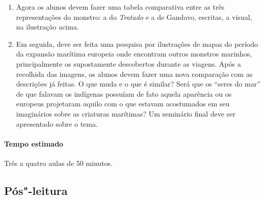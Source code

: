 \documentclass[12pt]{extarticle}
\begin{document}
{\begin{enumerate}
\begin{quote}
monstro, o qual em levantando a cabeça, tanto que o viu, começou de
caminhar para o mar donde viera. Nisto conheceu o mancebo que
era aquilo coisa do mar, e antes que nele se metesse, acudiu com muita
presteza a tomar"-lhe a dianteira, e vendo o monstro que ele lhe embargava 
o caminho, levantou"-se direito para cima como um homem, fincado sobre as 
barbatanas do rabo, e estando assim a par com ele, deu"-lhe uma estocada 
pela barriga, e dando"-lha no mesmo instante se desviou para uma parte 
com tanta velocidade, que não pôde o monstro levá"-lo debaixo de si; 
porém não pouco afrontado, porque o grande torno
de sangue que saiu da ferida, lhe deu no rosto com tanta força que
quase ficou sem nenhuma vista.
\end{quote}


\item Agora os alunos devem fazer uma tabela comparativa entre as três 
representações do monstro: a do \emph{Tratado} e a de Gandavo, escritas,
a visual, na ilustração acima. 

\item 
Em seguida, deve ser feita uma pesquisa por ilustrações de mapas do
período da expansão marítima europeia onde encontram outros monstros
marinhos, principalmente os supostamente descobertos durante as viagens.
Após a recolhida das imagens, os alunos devem fazer uma nova comparação 
com as descrições já feitas. O que muda e o que é similar? 
Será que os ``seres do mar'' de que falavam os indígenas possuíam de fato
aquela aparência ou os europeus projetaram aquilo com o que estavam 
acostumados em seu imaginários sobre as criaturas marítimas? 
Um seminário final deve ser apresentado sobre o tema. 

\end{enumerate}

\paragraph{Tempo estimado} Três a quatro aulas de 50 minutos.


\subsection{Pós"-leitura}

}
\end{document}
